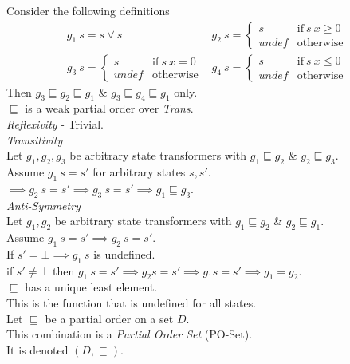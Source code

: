 \documentclass[11pt,a4paper]{article}
\begin{document}
Consider the following definitions
\[\begin{array}{cc}
g_1\ s=s\ \forall\ s&g_2\ s=\begin{cases}s&\mathrm{if\ }s\ x\geq 0\\ undef& \mathrm{otherwise}\end{cases}\\
g_3\ s=\begin{cases}s&\mathrm{if\ }s\ x= 0\\ undef& \mathrm{otherwise}\end{cases}&g_4\ s=\begin{cases}s&\mathrm{if\ }s\ x\leq 0\\ undef& \mathrm{otherwise}\end{cases}
\end{array}\]
Then $g_3\sqsubseteq g_2\sqsubseteq g_1$ \& $g_3\sqsubseteq g_4\sqsubseteq g_1$ only.\\

$\sqsubseteq$ is a weak partial order over \textit{Trans}.\\

\textit{Reflexivity} - Trivial.\\
\textit{Transitivity}\\
Let $g_1,g_2,g_3$ be arbitrary state transformers with $g_1\sqsubseteq g_2$ \& $g_2\sqsubseteq g_3$.\\
Assume $g_1\ s=s'$ for arbitrary states $s,s'$.\\
$\implies g_2\ s=s'\implies g_3\ s=s'\implies g_1\sqsubseteq g_3$.\\
\textit{Anti-Symmetry}\\
Let $g_1,g_2$ be arbitrary state transformers with $g_1\sqsubseteq g_2$ \& $g_2\sqsubseteq g_1$.\\
Assume $g_1\ s=s'\implies g_2\ s=s'$.\\
If $s'=\bot\implies g_1\ s$ is undefined.\\
if $s'\neq\bot$ then $g_1\ s=s'\implies g_2 s=s'\implies g_1 s=s'\implies g_1=g_2$.\\

$\sqsubseteq$ has a unique least element.\\
This is the function that is undefined for all states.\\

Let $\sqsubseteq$ be a partial order on a set $D$.\\
This combination is a \textit{Partial Order Set} (PO-Set).\\
It is denoted $(D,\sqsubseteq)$.\\
\end{document}
